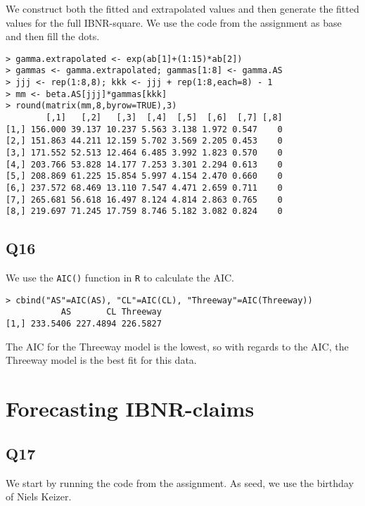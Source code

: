 \documentclass[11pt]{article}
\begin{document}
We construct both the fitted and extrapolated values and then generate the fitted values for the full IBNR-square. We use the code from the assignment as base and then fill the dots.
\begin{verbatim}
> gamma.extrapolated <- exp(ab[1]+(1:15)*ab[2])
> gammas <- gamma.extrapolated; gammas[1:8] <- gamma.AS
> jjj <- rep(1:8,8); kkk <- jjj + rep(1:8,each=8) - 1
> mm <- beta.AS[jjj]*gammas[kkk]
> round(matrix(mm,8,byrow=TRUE),3)
        [,1]   [,2]   [,3]  [,4]  [,5]  [,6]  [,7] [,8]
[1,] 156.000 39.137 10.237 5.563 3.138 1.972 0.547    0
[2,] 151.863 44.211 12.159 5.702 3.569 2.205 0.453    0
[3,] 171.552 52.513 12.464 6.485 3.992 1.823 0.570    0
[4,] 203.766 53.828 14.177 7.253 3.301 2.294 0.613    0
[5,] 208.869 61.225 15.854 5.997 4.154 2.470 0.660    0
[6,] 237.572 68.469 13.110 7.547 4.471 2.659 0.711    0
[7,] 265.681 56.618 16.497 8.124 4.814 2.863 0.765    0
[8,] 219.697 71.245 17.759 8.746 5.182 3.082 0.824    0
\end{verbatim}

\subsection*{Q16}

We use the \verb|AIC()| function in \verb|R| to calculate the AIC.

\begin{verbatim}
> cbind("AS"=AIC(AS), "CL"=AIC(CL), "Threeway"=AIC(Threeway))
           AS       CL Threeway
[1,] 233.5406 227.4894 226.5827
\end{verbatim}

The AIC for the Threeway model is the lowest, so with regards to the AIC, the Threeway model is the best fit for this data.

\section{Forecasting IBNR-claims}

\subsection*{Q17}

We start by running the code from the assignment. As seed, we use the birthday of Niels Keizer.
\end{document}
